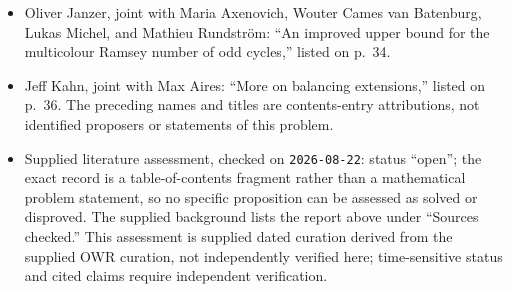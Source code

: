 \documentclass[11pt]{article}
\begin{document}
\begin{itemize}
\item Oliver Janzer, joint with Maria Axenovich, Wouter Cames van Batenburg, Lukas Michel, and Mathieu Rundström: ``An improved upper bound for the multicolour Ramsey number of odd cycles,'' listed on p.~34.
\item Jeff Kahn, joint with Max Aires: ``More on balancing extensions,'' listed on p.~36. The preceding names and titles are contents-entry attributions, not identified proposers or statements of this problem.
\item Supplied literature assessment, checked on \texttt{2026-08-22}: status ``open''; the exact record is a table-of-contents fragment rather than a mathematical problem statement, so no specific proposition can be assessed as solved or disproved. The supplied background lists the report above under ``Sources checked.'' This assessment is supplied dated curation derived from the supplied OWR curation, not independently verified here; time-sensitive status and cited claims require independent verification.
\end{itemize}
\end{document}

